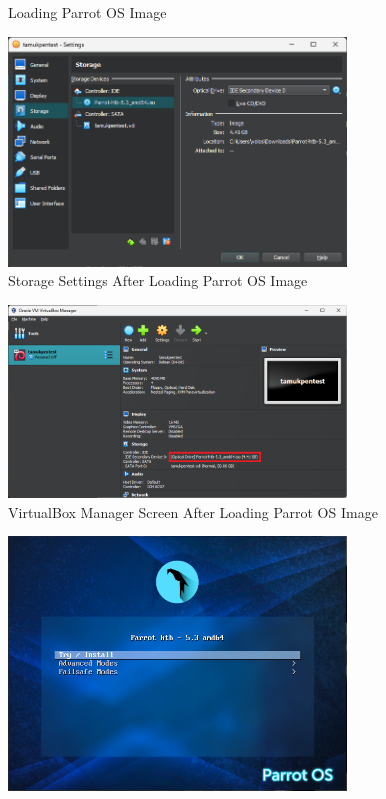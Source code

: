 \documentclass[12pt]{article}
\newenvironment{problem}[2][Problem]{\begin{trivlist}
\item[\hskip \labelsep {\bfseries #1}\hskip \labelsep {\bfseries #2.}]}{\end{trivlist}}
\begin{document}
\begin{problem}{1}
\begin{figure}[H]
        \caption{Loading Parrot OS Image}
    \end{figure}
    \begin{figure}[H]
        \centering
        \includegraphics[width=0.8\textwidth]{storage2}
        \caption{Storage Settings After Loading Parrot OS Image}
    \end{figure}
    \begin{figure}[H]
        \centering
        \includegraphics[width=0.8\textwidth]{manager3}
        \caption{VirtualBox Manager Screen After Loading Parrot OS Image}
    \end{figure}
    \begin{figure}[H]
        \centering
        \includegraphics[width=0.8\textwidth]{parrot_install1}

\end{figure}
\end{problem}
\end{document}
